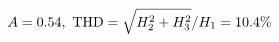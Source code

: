 \documentclass[preview]{standalone}
\begin{document}
\begin{align*}
\special{dvisvgm:raw <g id='unique000'>}A=0.54,\ \text{THD}=\sqrt{H_2^2+H_3^2}/H_1=10.4\%\special{dvisvgm:raw </g>}
\end{align*}
\end{document}
